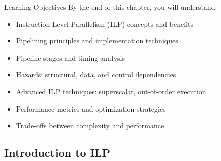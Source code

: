 
\begin{frame}{Learning Objectives}
By the end of this chapter, you will understand:
\begin{itemize}
\item Instruction Level Parallelism (ILP) concepts and benefits
\item Pipelining principles and implementation techniques
\item Pipeline stages and timing analysis
\item Hazards: structural, data, and control dependencies
\item Advanced ILP techniques: superscalar, out-of-order execution
\item Performance metrics and optimization strategies
\item Trade-offs between complexity and performance
\end{itemize}
\end{frame}

\subsection{Introduction to ILP}

